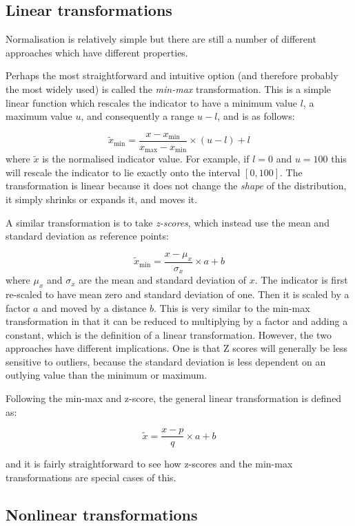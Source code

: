 \documentclass[
]{book}
\begin{document}
\hypertarget{linear-transformations}{%
\subsection{Linear transformations}\label{linear-transformations}}

Normalisation is relatively simple but there are still a number of different approaches which have different properties.

Perhaps the most straightforward and intuitive option (and therefore probably the most widely used) is called the \emph{min-max} transformation. This is a simple linear function which rescales the indicator to have a minimum value \(l\), a maximum value \(u\), and consequently a range \(u-l\), and is as follows:

\[ \tilde{x}_{\text{min}} = \frac{ x - x_{\text{min}} }{ x_{\text{max}} - x_{\text{min}} } \times (u-l) + l\]
where \(\tilde{x}\) is the normalised indicator value. For example, if \(l=0\) and \(u=100\) this will rescale the indicator to lie exactly onto the interval \([0, 100]\). The transformation is linear because it does not change the \emph{shape} of the distribution, it simply shrinks or expands it, and moves it.

A similar transformation is to take \emph{z-scores}, which instead use the mean and standard deviation as reference points:

\[ \tilde{x}_{\text{min}} = \frac{ x - \mu_x }{ \sigma_x } \times a + b\]
where \(\mu_x\) and \(\sigma_x\) are the mean and standard deviation of \(x\). The indicator is first re-scaled to have mean zero and standard deviation of one. Then it is scaled by a factor \(a\) and moved by a distance \(b\). This is very similar to the min-max transformation in that it can be reduced to multiplying by a factor and adding a constant, which is the definition of a linear transformation. However, the two approaches have different implications. One is that Z scores will generally be less sensitive to outliers, because the standard deviation is less dependent on an outlying value than the minimum or maximum.

Following the min-max and z-score, the general linear transformation is defined as:

\[ \tilde{x} = \frac{ x - p }{ q } \times a + b\]

and it is fairly straightforward to see how z-scores and the min-max transformations are special cases of this.

\hypertarget{nonlinear-transformations}{%
\subsection{Nonlinear transformations}\label{nonlinear-transformations}}
\end{document}
